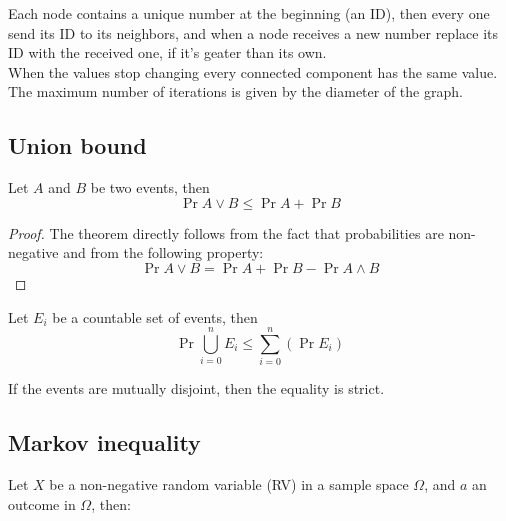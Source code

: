     \begin{ex}
        Each node contains a unique number at the beginning (an ID), then every one send its ID to its neighbors, and when a node receives a new number replace its ID with the received one, if it's geater than its own. \\
        When the values stop changing every connected component has the same value.
        The maximum number of iterations is given by the diameter of the graph.
    \end{ex}


\subsection{Union bound}

	\begin{defn}
        Let $A$ and $B$ be two events, then
        \begin{equation}\label{eq:union-bound}
            \Pr{A \vee B} \leq \Pr{A} + \Pr{B}
        \end{equation}
    \end{defn}

    \begin{proof}
        The theorem directly follows from the fact that probabilities are non-negative and from the following property:
        \begin{equation}\label{eq:prob-or}
            \Pr{A \vee B} = \Pr{A} + \Pr{B} - \Pr{A \wedge B}
        \end{equation}
    \end{proof}
    
	\begin{defn}
        Let $E_i$ be a countable set of events, then
        \begin{equation}\label{eq:union-buond}
            \Pr{\bigcup_{i=0}^n E_i} \leq \sum_{i=0}^{n}(\Pr{E_i})
        \end{equation}
    \end{defn}
    
	If the events are mutually disjoint, then the equality is strict.

	
\subsection{Markov inequality}
	
	Let $X$ be a non-negative random variable (RV) in a sample space $\Omega$, and $a$ an outcome in $\Omega$, then:
	
